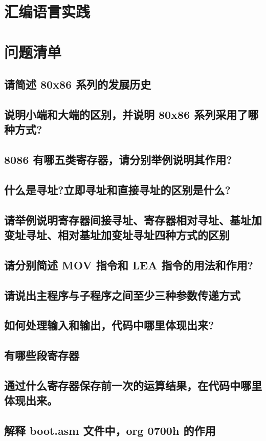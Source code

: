 \documentclass{article}
\begin{document}
\section{汇编语言实践}

\section{问题清单}
\subsection{请简述 80x86 系列的发展历史}
\subsection{说明小端和大端的区别，并说明 80x86 系列采用了哪种方式?}
\subsection{8086 有哪五类寄存器，请分别举例说明其作用?}
\subsection{什么是寻址?立即寻址和直接寻址的区别是什么?}
\subsection{请举例说明寄存器间接寻址、寄存器相对寻址、基址加变址寻址、相对基址加变址寻址四种方式的区别}
\subsection{请分别简述 MOV 指令和 LEA 指令的用法和作用?}
\subsection{请说出主程序与子程序之间至少三种参数传递方式}
\subsection{如何处理输入和输出，代码中哪里体现出来?}
\subsection{有哪些段寄存器}
\subsection{通过什么寄存器保存前一次的运算结果，在代码中哪里体现出来。}
\subsection{解释 boot.asm 文件中，org 0700h 的作用}
\end{document}
